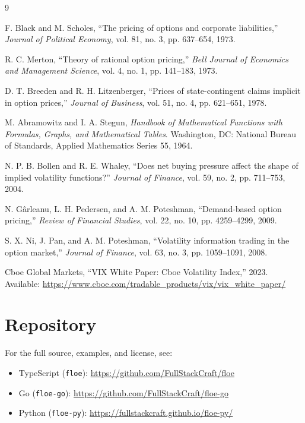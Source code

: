 \documentclass[11pt, a4paper]{article}
\begin{document}
\begin{thebibliography}{9}

F. Black and M. Scholes,
``The pricing of options and corporate liabilities,''
\textit{Journal of Political Economy}, vol. 81, no. 3, pp. 637--654, 1973.

R. C. Merton,
``Theory of rational option pricing,''
\textit{Bell Journal of Economics and Management Science}, vol. 4, no. 1, pp. 141--183, 1973.

D. T. Breeden and R. H. Litzenberger,
``Prices of state-contingent claims implicit in option prices,''
\textit{Journal of Business}, vol. 51, no. 4, pp. 621--651, 1978.

M. Abramowitz and I. A. Stegun,
\textit{Handbook of Mathematical Functions with Formulas, Graphs, and Mathematical Tables}.
Washington, DC: National Bureau of Standards, Applied Mathematics Series 55, 1964.


N. P. B. Bollen and R. E. Whaley,
``Does net buying pressure affect the shape of implied volatility functions?''
\textit{Journal of Finance}, vol. 59, no. 2, pp. 711--753, 2004.

N. G\^{a}rleanu, L. H. Pedersen, and A. M. Poteshman,
``Demand-based option pricing,''
\textit{Review of Financial Studies}, vol. 22, no. 10, pp. 4259--4299, 2009.

S. X. Ni, J. Pan, and A. M. Poteshman,
``Volatility information trading in the option market,''
\textit{Journal of Finance}, vol. 63, no. 3, pp. 1059--1091, 2008.

Cboe Global Markets,
``VIX White Paper: Cboe Volatility Index,''
2023. Available: \url{https://www.cboe.com/tradable_products/vix/vix_white_paper/}

\end{thebibliography}

\appendix
\section{Repository}

For the full source, examples, and license, see:
\begin{itemize}
    \item TypeScript (\texttt{floe}): \href{https://github.com/FullStackCraft/floe}{https://github.com/FullStackCraft/floe}
    \item Go (\texttt{floe-go}): \href{https://github.com/FullStackCraft/floe-go}{https://github.com/FullStackCraft/floe-go}
    \item Python (\texttt{floe-py}): \href{https://fullstackcraft.github.io/floe-py/}{https://fullstackcraft.github.io/floe-py/}
\end{itemize}
\end{document}
